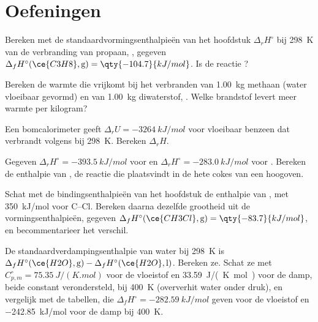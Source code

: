 \section{Oefeningen}

\begin{exercise}[$\star$]\label{exo:b2:reaction-enthalpy:1}
Bereken met de standaardvormingsenthalpieën van het hoofdstuk
$\Delta_r H^\circ$ bij \qty{298}{K} van de verbranding van propaan,
, gegeven $\Delta_f
H^\circ(\ce{C3H8}, \text{g}) = \qty{-104.7}{kJ/mol}$. Is de reactie
?
\end{exercise}

\begin{exercise}[$\star$]\label{exo:b2:reaction-enthalpy:2}
Bereken de warmte die vrijkomt bij het verbranden van \qty{1.00}{kg} methaan (water
vloeibaar gevormd) en van \qty{1.00}{kg} diwaterstof, . Welke brandstof levert meer warmte per kilogram?
\end{exercise}

\begin{exercise}[$\star$]\label{exo:b2:reaction-enthalpy:3}
Een bomcalorimeter geeft $\Delta_r U = \qty{-3264}{kJ/mol}$ voor vloeibaar
benzeen dat verbrandt volgens  bij
\qty{298}{K}. Bereken $\Delta_r H$.
\end{exercise}

\begin{exercise}[$\star$]\label{exo:b2:reaction-enthalpy:4}
Gegeven $\Delta_r H^\circ = \qty{-393.5}{kJ/mol}$ voor  en $\Delta_r H^\circ = \qty{-283.0}{kJ/mol}$ voor . Bereken de enthalpie van ,
de reactie die plaatsvindt in de hete cokes van een hoogoven.
\end{exercise}

\begin{exercise}[$\star\star$]\label{exo:b2:reaction-enthalpy:5}
Schat met de bindingsenthalpieën van het hoofdstuk de enthalpie van
, met \qty{350}{kJ/mol} voor
C--Cl. Bereken daarna dezelfde grootheid uit de vormingsenthalpieën,
gegeven $\Delta_f H^\circ(\ce{CH3Cl}, \text{g}) = \qty{-83.7}{kJ/mol}$, en
becommentarieer het verschil.
\end{exercise}

\begin{exercise}[$\star\star$]\label{exo:b2:reaction-enthalpy:6}
De standaardverdampingsenthalpie van water bij \qty{298}{K} is
$\Delta_f H^\circ(\ce{H2O}, \text{g}) - \Delta_f H^\circ(\ce{H2O},
\text{l})$. Bereken ze. Schat ze met $C_{p,m}^\circ = \qty{75.35}{J/(K.mol)}$ voor
de vloeistof en \qty{33.59}{J/(K.mol)} voor de damp, beide constant
verondersteld, bij \qty{400}{K} (oververhit water onder druk),
en vergelijk met de tabellen, die $\Delta_f H^\circ =
\qty{-282.59}{kJ/mol}$ geven voor de vloeistof en \qty{-242.85}{kJ/mol} voor de
damp bij \qty{400}{K}.
\end{exercise}

